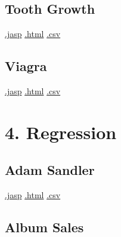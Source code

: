 \documentclass[
  letterpaper,
  DIV=11,
  numbers=noendperiod]{scrreprt}
\begin{document}
\hypertarget{tooth-growth}{%
\section{Tooth Growth}\label{tooth-growth}}

\textbar{}
\href{https://github.com/jasp-stats/jasp-data-library/raw/main/Tooth\%20Growth/Tooth\%20Growth.jasp}{.jasp}
\textbar{}
\href{https://htmlpreview.github.io/?https://github.com/jasp-stats/jasp-data-library/blob/main/Tooth\%20Growth/index.html}{.html}
\textbar{}
\href{https://raw.githubusercontent.com/jasp-stats/jasp-data-library/main/Tooth\%20Growth/Tooth\%20Growth.csv}{.csv}

\hypertarget{viagra}{%
\section{Viagra}\label{viagra}}

\textbar{}
\href{https://github.com/jasp-stats/jasp-data-library/raw/main/Viagra/Viagra.jasp}{.jasp}
\textbar{}
\href{https://htmlpreview.github.io/?https://github.com/jasp-stats/jasp-data-library/blob/main/Viagra/index.html}{.html}
\textbar{}
\href{https://raw.githubusercontent.com/jasp-stats/jasp-data-library/main/Viagra/Viagra.csv}{.csv}


\hypertarget{regression}{%
\chapter{4. Regression}\label{regression}}

\hypertarget{adam-sandler}{%
\section{Adam Sandler}\label{adam-sandler}}

\textbar{}
\href{https://github.com/jasp-stats/jasp-data-library/raw/main/Adam\%20Sandler/Adam\%20Sandler.jasp}{.jasp}
\textbar{}
\href{https://htmlpreview.github.io/?https://github.com/jasp-stats/jasp-data-library/blob/main/Adam\%20Sandler/index.html}{.html}
\textbar{}
\href{https://raw.githubusercontent.com/jasp-stats/jasp-data-library/main/Adam\%20Sandler/Adam\%20Sandler.csv}{.csv}

\hypertarget{album-sales}{%
\section{Album Sales}\label{album-sales}}
\end{document}
